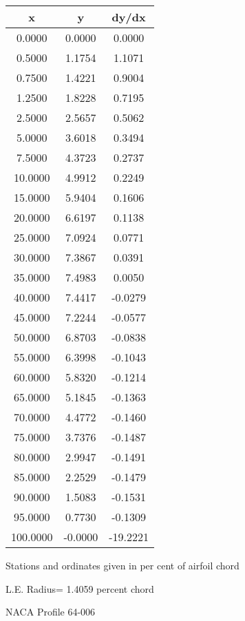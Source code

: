 \documentclass[11pt]{book}
\begin{document}
 \vspace{8mm}
 \begin{tabular}{|c|c|c|} \hline 
  x  &  y  &  dy/dx \\
 \hline
0.0000 & 0.0000 & 0.0000 \\
0.5000 & 1.1754 & 1.1071 \\
0.7500 & 1.4221 & 0.9004 \\
1.2500 & 1.8228 & 0.7195 \\
2.5000 & 2.5657 & 0.5062 \\
5.0000 & 3.6018 & 0.3494 \\
7.5000 & 4.3723 & 0.2737 \\
10.0000 & 4.9912 & 0.2249 \\
15.0000 & 5.9404 & 0.1606 \\
20.0000 & 6.6197 & 0.1138 \\
25.0000 & 7.0924 & 0.0771 \\
30.0000 & 7.3867 & 0.0391 \\
35.0000 & 7.4983 & 0.0050 \\
40.0000 & 7.4417 & -0.0279 \\
45.0000 & 7.2244 & -0.0577 \\
50.0000 & 6.8703 & -0.0838 \\
55.0000 & 6.3998 & -0.1043 \\
60.0000 & 5.8320 & -0.1214 \\
65.0000 & 5.1845 & -0.1363 \\
70.0000 & 4.4772 & -0.1460 \\
75.0000 & 3.7376 & -0.1487 \\
80.0000 & 2.9947 & -0.1491 \\
85.0000 & 2.2529 & -0.1479 \\
90.0000 & 1.5083 & -0.1531 \\
95.0000 & 0.7730 & -0.1309 \\
100.0000 & -0.0000 & -19.2221 \\
 \hline
 \end{tabular}
 \vspace{8mm}


Stations and ordinates given in per cent of airfoil chord 


L.E. Radius=  1.4059 percent chord
 \newpage
  \label{p64-006}
 \begin{Large}
 NACA Profile 64-006
 \end{Large}
  
\end{document}
